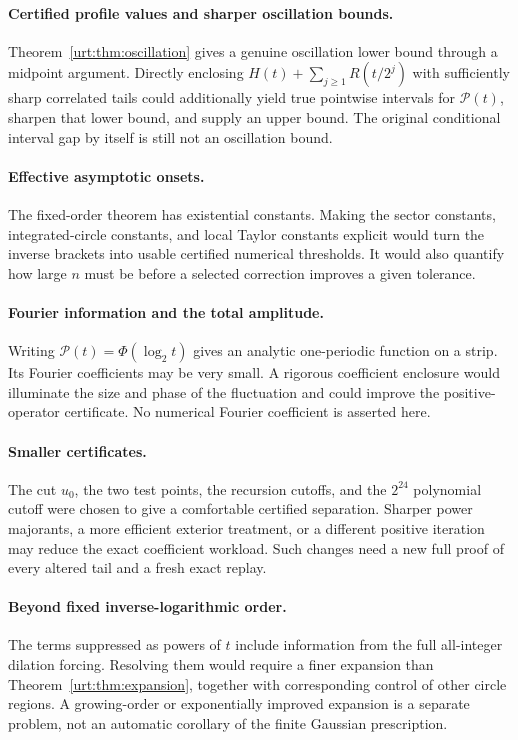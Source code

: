 \documentclass[11pt,letterpaper]{article}
\theoremstyle{remark}\newtheorem{remark}[theorem]{Remark}
\newcommand{\Pc}{\mathcal P}\newcommand{\Bc}{\mathcal B}\newcommand{\dd}{\mathrm d}
\begin{document}
\paragraph{Certified profile values and sharper oscillation bounds.}
Theorem~\ref{urt:thm:oscillation} gives a genuine oscillation lower bound through a midpoint argument. Directly enclosing $H(t)+\sum_{j\ge1}R(t/2^j)$ with sufficiently sharp correlated tails could additionally yield true pointwise intervals for $\Pc(t)$, sharpen that lower bound, and supply an upper bound. The original conditional interval gap by itself is still not an oscillation bound.

\paragraph{Effective asymptotic onsets.}
The fixed-order theorem has existential constants. Making the sector constants, integrated-circle constants, and local Taylor constants explicit would turn the inverse brackets into usable certified numerical thresholds. It would also quantify how large $n$ must be before a selected correction improves a given tolerance.

\paragraph{Fourier information and the total amplitude.}
Writing $\Pc(t)=\Phi(\log_2 t)$ gives an analytic one-periodic function on a strip. Its Fourier coefficients may be very small. A rigorous coefficient enclosure would illuminate the size and phase of the fluctuation and could improve the positive-operator certificate. No numerical Fourier coefficient is asserted here.

\paragraph{Smaller certificates.}
The cut $u_0$, the two test points, the recursion cutoffs, and the $2^{24}$ polynomial cutoff were chosen to give a comfortable certified separation. Sharper power majorants, a more efficient exterior treatment, or a different positive iteration may reduce the exact coefficient workload. Such changes need a new full proof of every altered tail and a fresh exact replay.

\paragraph{Beyond fixed inverse-logarithmic order.}
The terms suppressed as powers of $t$ include information from the full all-integer dilation forcing. Resolving them would require a finer expansion than Theorem~\ref{urt:thm:expansion}, together with corresponding control of other circle regions. A growing-order or exponentially improved expansion is a separate problem, not an automatic corollary of the finite Gaussian prescription.
\end{document}
